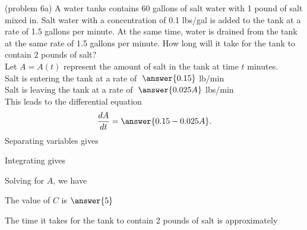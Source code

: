 \documentclass{ximera}
\begin{document}
\begin{problem}(problem 6a)
A water tanks contains 60 gallons of salt water with 1 pound of salt mixed in. 
Salt water with a concentration of 0.1 lbs/gal is added to the tank at a rate of 1.5 gallons per minute.
At the same time, water is drained from the tank at the same rate of 1.5 gallons per minute.
How long will it take for the tank to contain 2 pounds of salt?\\


Let $A = A(t)$ represent the amount of salt in the tank at time $t$ minutes. \\


Salt is entering the tank at a rate of $\; \answer{0.15}$ \; lb/min \\
Salt is leaving the tank at a rate of $\; \answer{0.025A}$ \; lbs/min \\

This leads to the differential equation
\[
\frac{dA}{dt} = \answer{0.15 - 0.025A}.
\]
Separating variables gives

\begin{multipleChoice}
\end{multipleChoice}


Integrating gives
\begin{multipleChoice}
\end{multipleChoice}


Solving for $A$, we have

\begin{multipleChoice}
\end{multipleChoice}

The value of $C$ is $\answer{5}$

The time it takes for the tank to contain 2 pounds of salt  is approximately

\begin{multipleChoice}
\end{multipleChoice}

\end{problem}
\end{document}
